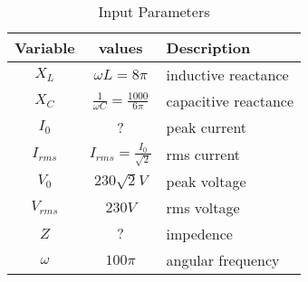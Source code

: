 \begin{table}[htbp]
\centering
\renewcommand\thetable{1}
\begin{tabular}{|c|c|m{3cm}|}
    \hline
    \textbf{Variable} & \textbf{values} & \textbf{Description} \\
    \hline
    $X_L$ & $\omega L = 8\pi$ & inductive reactance\\
    \hline
    $ X_C $ & $\frac{1}{\omega C} = \frac{1000}{6\pi}$& capacitive reactance\\
    \hline
    $I_0$ & ? & peak current\\
    \hline
    $I_{rms}$ & $I_{rms}=\frac{I_0}{\sqrt 2}$ & rms current\\
    \hline
   $V_{0}$ & $230\sqrt 2 V$ & peak voltage\\
    \hline
     $V_{rms}$ & $230 V$ & rms voltage\\
    \hline
     $Z$ & $?$ & impedence\\
    \hline
     $\omega$ & $100\pi$ & angular frequency\\
    \hline
\end{tabular}
\caption{Input Parameters}
\label{tab:12.7.18}
\end{table}
